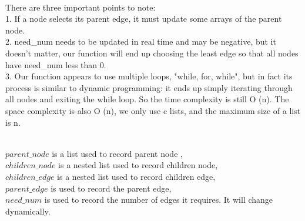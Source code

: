 \documentclass[12pt,a4paper]{article}
\begin{document}
\noindent
\\There are three important points to note: 
\\1. If a node selects its parent edge, it must update some arrays of the parent node. 
\\2. need\_num needs to be updated in real time and may be negative, but it doesn't matter, our function will end up choosing the least edge so that all nodes have need\_num less than 0.
\\3. Our function appears to use multiple loops, "while, for, while", but in fact its process is similar to dynamic programming: it ends up simply iterating through all nodes and exiting the while loop. So the time complexity is still O (n). The space complexity is also O (n), we only use c lists, and the maximum size of a list is n.


\noindent
\\$parent\_node$ is a list used to record parent node , 
\\$children\_node$ is a nested list used to record children node, 
\\$children\_edge$ is a nested list used to record children edge, 
\\$parent\_edge$ is used to record the parent edge, 
\\$need\_num$ is used to record the number of edges it requires. It will change dynamically.
\end{document}
